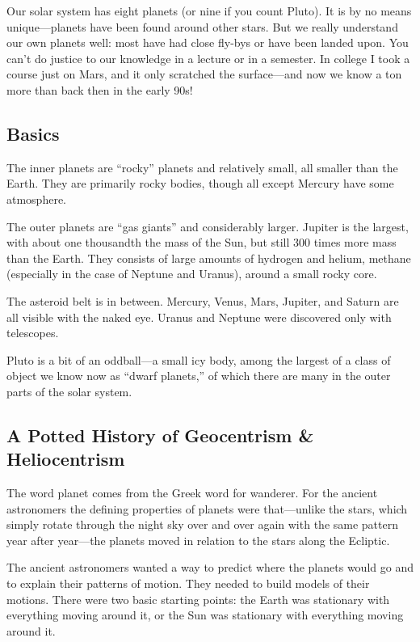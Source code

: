 \documentclass[12pt, preprint]{aastex}
\begin{document}
Our solar system has eight planets (or nine if you count Pluto). It is
by no means unique---planets have been found around other stars. But
we really understand our own planets well: most have had close fly-bys
or have been landed upon. You can't do justice to our knowledge in a
lecture or in a semester. In college I took a course just on Mars, and
it only scratched the surface---and now we know a ton more than back
then in the early 90s!

\subsection{Basics}

The inner planets are ``rocky'' planets and relatively small, all
smaller than the Earth. They are primarily rocky bodies, though all
except Mercury have some atmosphere.

The outer planets are ``gas giants'' and considerably larger. Jupiter
is the largest, with about one thousandth the mass of the Sun, but
still 300 times more mass than the Earth. They consists of large
amounts of hydrogen and helium, methane (especially in the case of
Neptune and Uranus), around a small rocky core.

The asteroid belt is in between. Mercury, Venus, Mars, Jupiter, and
Saturn are all visible with the naked eye. Uranus and Neptune were
discovered only with telescopes.

Pluto is a bit of an oddball---a small icy body, among the largest of
a class of object we know now as ``dwarf planets,'' of which there are
many in the outer parts of the solar system. 

\subsection{A Potted History of Geocentrism \& Heliocentrism}

The word planet comes from the Greek word for wanderer. For the
ancient astronomers the defining properties of planets were
that---unlike the stars, which simply rotate through the night sky
over and over again with the same pattern year after year---the
planets moved in relation to the stars along the Ecliptic.

The ancient astronomers wanted a way to predict where the planets
would go and to explain their patterns of motion. They needed to build
models of their motions. There were two basic starting points: the
Earth was stationary with everything moving around it, or the Sun was
stationary with everything moving around it.
\end{document}
